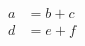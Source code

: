 \documentclass{article}
\begin{document}
\begin{align}
  a &= b + c \\
  d &= e + f
\end{align}
\end{document}
